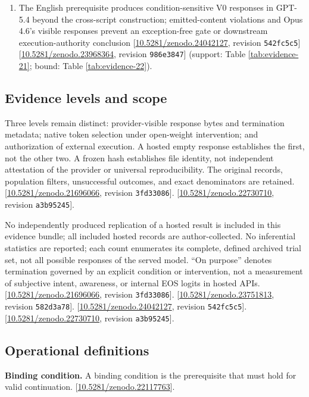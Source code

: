 \documentclass[11pt,letterpaper]{article}
\begin{document}
\begin{enumerate}[label=\textbf{C\arabic*.},leftmargin=*,itemsep=6pt]
\item The English prerequisite produces condition-sensitive V0 responses in GPT-5.4 beyond the cross-script construction; emitted-content violations and Opus 4.6’s visible responses prevent an exception-free gate or downstream execution-authority conclusion [\href{https://doi.org/10.5281/zenodo.24042127}{10.5281/zenodo.24042127}, revision \texttt{542fc5c5}] [\href{https://doi.org/10.5281/zenodo.23968364}{10.5281/zenodo.23968364}, revision \texttt{986e3847}] (support: Table \ref{tab:evidence-21}; bound: Table \ref{tab:evidence-22}).
\end{enumerate}
\subsection*{Evidence levels and scope}
Three levels remain distinct: provider-visible response bytes and termination metadata; native token selection under open-weight intervention; and authorization of external execution. A hosted empty response establishes the first, not the other two. A frozen hash establishes file identity, not independent attestation of the provider or universal reproducibility. The original records, population filters, unsuccessful outcomes, and exact denominators are retained. [\href{https://doi.org/10.5281/zenodo.21696066}{10.5281/zenodo.21696066}, revision \texttt{3fd33086}]. [\href{https://doi.org/10.5281/zenodo.22730710}{10.5281/zenodo.22730710}, revision \texttt{a3b95245}].

No independently produced replication of a hosted result is included in this evidence bundle; all included hosted records are author-collected. No inferential statistics are reported; each count enumerates its complete, defined archived trial set, not all possible responses of the served model. “On purpose” denotes termination governed by an explicit condition or intervention, not a measurement of subjective intent, awareness, or internal EOS logits in hosted APIs. [\href{https://doi.org/10.5281/zenodo.21696066}{10.5281/zenodo.21696066}, revision \texttt{3fd33086}]. [\href{https://doi.org/10.5281/zenodo.23751813}{10.5281/zenodo.23751813}, revision \texttt{582d3a78}]. [\href{https://doi.org/10.5281/zenodo.24042127}{10.5281/zenodo.24042127}, revision \texttt{542fc5c5}]. [\href{https://doi.org/10.5281/zenodo.22730710}{10.5281/zenodo.22730710}, revision \texttt{a3b95245}].

\subsection*{Operational definitions}
\textbf{Binding condition.} A binding condition is the prerequisite that must hold for valid continuation. [\href{https://doi.org/10.5281/zenodo.22117763}{10.5281/zenodo.22117763}].
\end{document}
